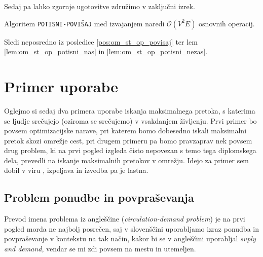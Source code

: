 \documentclass[mat1]{fmfdelo}
\begin{document}
Sedaj pa lahko zgornje ugotovitve združimo v zaključni izrek.

\begin{izrek}
Algoritem \texttt{POTISNI-POVIŠAJ} med izvajanjem naredi $\mathcal{O}(V^2E)$ osnovnih operacij.
\end{izrek}

\begin{dokaz}
Sledi neposredno iz posledice \ref{pos:om_st_op_povisaj} ter lem \ref{lem:om_st_op_potisni_nas} in \ref{lem:om_st_op_potisni_nezas}.
\end{dokaz}


\section{Primer uporabe}


Oglejmo si sedaj dva primera uporabe iskanja maksimalnega pretoka, s katerima se ljudje srečujejo (oziroma se srečujemo) v vsakdanjem življenju. Prvi primer bo povsem
optimizacijske narave, pri katerem bomo dobesedno iskali maksimalni pretok skozi omrežje cest, pri drugem primeru
pa bomo pravzaprav nek povsem drug problem, ki na prvi pogled izgleda čisto nepovezan s temo tega diplomskega
dela, prevedli na iskanje maksimalnih pretokov v omrežju. Idejo za primer sem dobil v viru \cite{wiki}, izpeljava in izvedba pa je lastna.


\subsection{Problem ponudbe in povpraševanja}

Prevod imena problema iz angleščine (\textit{circulation-demand problem}) je na prvi pogled morda ne najbolj posrečen,
saj v slovenščini uporabljamo izraz ponudba in povpraševanje v kontekstu na tak način, kakor bi se v angleščini uporabljal
\textit{suply and demand}, vendar se mi zdi povsem na mestu in utemeljen.
\end{document}
